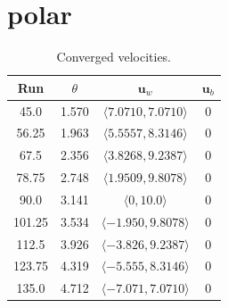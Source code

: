 \clearpage 
\section{polar}
    \begin{table}[ht!]
        \centering\begin{tabular}{c|c|c|c}
            Run & $\theta$ & $\mathbf{u}_w$ & $\mathbf{u}_b$ \\
            \hline
            45.0 	& 	1.570 	& 	$\langle 7.0710 , 7.0710 \rangle$ & 0 \\
            56.25 	& 	1.963 	& 	$\langle 5.5557 , 8.3146 \rangle$ & 0 \\
            67.5 	& 	2.356 	& 	$\langle 3.8268 , 9.2387 \rangle$ & 0 \\
            78.75 	& 	2.748 	& 	$\langle 1.9509 , 9.8078 \rangle$ & 0 \\
            90.0 	& 	3.141 	& 	$\langle 0      , 10.0   \rangle$ & 0 \\
            101.25 	& 	3.534 	& 	$\langle -1.950 , 9.8078 \rangle$ & 0 \\
            112.5 	& 	3.926 	& 	$\langle -3.826 , 9.2387 \rangle$ & 0 \\
            123.75 	& 	4.319 	& 	$\langle -5.555 , 8.3146 \rangle$ & 0 \\
            135.0 	& 	4.712 	& 	$\langle -7.071 , 7.0710 \rangle$ & 0 
        \end{tabular}
        \caption{Converged velocities.}
        \label{tab:converged_velocities}
    \end{table}

